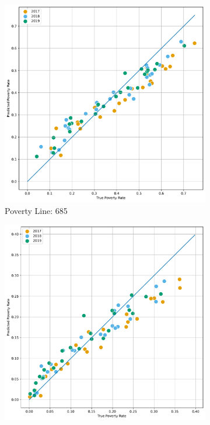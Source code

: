 \begin{figure}[H]
    \caption{Correlation: Predicted Poverty against true by Region}
    \centering
         \centering
         \begin{subfigure}[b]{0.47\textwidth}
             \centering
             \includegraphics[width=\textwidth]{../figures/fig4_2_prediction_vs_true_poverty_rate_regions_p685_scatter.pdf}
             \caption{Poverty Line: 685}
         \end{subfigure}
         \hfill
         \begin{subfigure}[b]{0.47\textwidth}
             \centering
             \includegraphics[width=\textwidth]{../figures/fig4_2_prediction_vs_true_poverty_rate_regions_p365_scatter.pdf}

\end{subfigure}
\end{figure}
